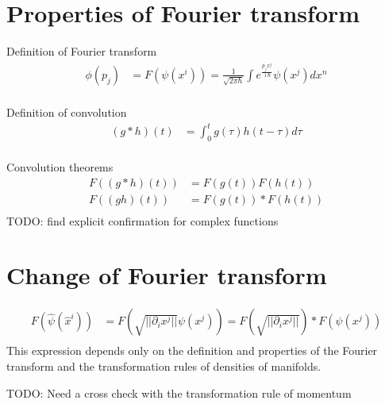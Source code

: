 \documentclass[11pt]{article}
\begin{document}
\section{Properties of Fourier transform}

Definition of Fourier transform
\begin{equation}
	\begin{aligned}
		\phi(p_j) &= F(\psi(x^i)) = \frac{1}{\sqrt{2 \pi \hbar}} \int e^{\frac{p_j x^j}{\imath \hbar}} \psi(x^j) dx^n \\
	\end{aligned}
\end{equation}

Definition of convolution
\begin{equation}
	\begin{aligned}
		(g * h)(t) &= \int_{0}^{t} g(\tau) h(t-\tau) d\tau\\
	\end{aligned}
\end{equation}

Convolution theorems
\begin{equation}
	\begin{aligned}
		F((g * h)(t)) &= F(g(t)) F(h(t))\\
		F((g h)(t)) &= F(g(t)) * F(h(t))\\
	\end{aligned}
\end{equation}
TODO: find explicit confirmation for complex functions

\section{Change of Fourier transform}
\begin{equation}
	\begin{aligned}
		F(\hat{\psi}(\hat{x}^i)) &= F\left(\sqrt{|| \partial_i x^j ||} \psi(x^j)\right) = F\left(\sqrt{|| \partial_i x^j ||}\right) * F \left( \psi(x^j)\right)  \\
	\end{aligned}
\end{equation}
This expression depends only on the definition and properties of the Fourier transform and the transformation rules of densities of manifolds.

TODO: Need a cross check with the transformation rule of momentum
\end{document}
